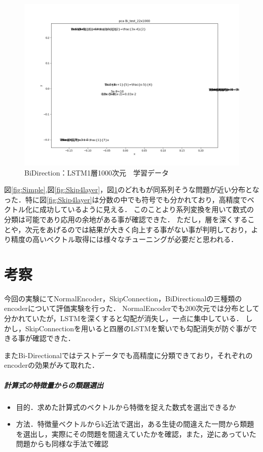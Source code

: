 \documentclass[a4j,11pt,report]{jsbook}
\begin{document}
\begin{center}
  \begin{figure}[tb]
    \centering
    \includegraphics[width=0.7\linewidth]{result/pca_formula_Bi_test_22x1000_1_Wed_Feb_06_06:54:20.png}
    \caption{BiDirection：LSTM1層1000次元　学習データ}
    \label{fig:Bi500layer4}
  \end{figure}
\end{center}

図\ref{fig:Simple},図\ref{fig:Skip4layer}，図\ref{fig:Bi500layer4}のどれもが同系列そうな問題が近い分布となった．特に図\ref{fig:Skip4layer}は分数の中でも符号でも分かれており，高精度でベクトル化に成功しているように見える．
このことより系列変換を用いて数式の分類は可能であり応用の余地がある事が確認できた．
ただし，層を深くすることや，次元をあげるのでは結果が大きく向上する事がない事が判明しており，より精度の高いベクトル取得には様々なチューニングが必要だと思われる．




\section{考察}
今回の実験にてNormalEncoder，SkipConnection，BiDirectionalの三種類のencoderについて評価実験を行った．
NormalEncoderでも200次元では分布として分かれていたが，LSTMを深くすると勾配が消失し，一点に集中している．
しかし，SkipConnectionを用いると四層のLSTMを繋いでも勾配消失が防ぐ事ができる事が確認できた．

またBi-Directionalではテストデータでも高精度に分類できており，それぞれのencoderの効果がみて取れた．



\subparagraph{計算式の特徴量からの類題選出}
\begin{itemize}ß
  \item 目的．求めた計算式のベクトルから特徴を捉えた数式を選出できるか
  \item 方法．特徴量ベクトルからk近法で選出，ある生徒の間違えた一問から類題を選出し，実際にその問題を間違えていたかを確認，また，逆にあっていた問題からも同様な手法で確認

\end{itemize}
\fi
\end{document}
